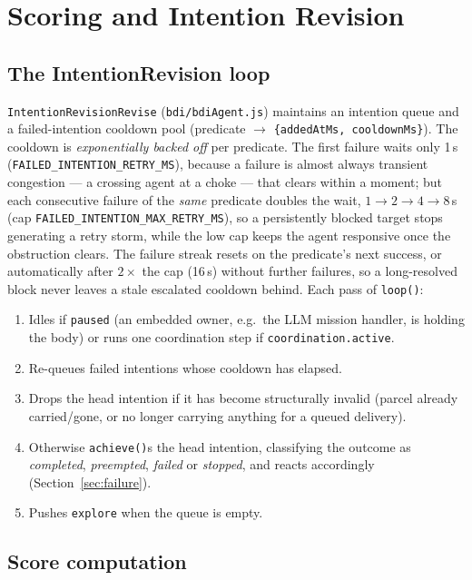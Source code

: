 \documentclass[11pt,a4paper]{article}
\begin{document}
\section{Scoring and Intention Revision}
\label{sec:scoring}

\subsection{The IntentionRevision loop}

\texttt{IntentionRevisionRevise} (\texttt{bdi/bdiAgent.js}) maintains an intention queue and a
failed-intention cooldown pool (predicate $\to$ \texttt{\{addedAtMs, cooldownMs\}}). The cooldown
is \emph{exponentially backed off} per predicate. The first failure waits only 1\,s
(\texttt{FAILED\_INTENTION\_RETRY\_MS}), because a failure is almost always transient congestion
--- a crossing agent at a choke --- that clears within a moment; but each consecutive failure of
the \emph{same} predicate doubles the wait, $1 \to 2 \to 4 \to 8$\,s
(cap \texttt{FAILED\_INTENTION\_MAX\_RETRY\_MS}), so a persistently blocked target stops
generating a retry storm, while the low cap keeps the agent responsive once the obstruction
clears. The failure streak resets on the predicate's next success, or automatically after
$2\times$ the cap (16\,s) without further failures, so a long-resolved block never leaves a stale
escalated cooldown behind. Each pass of \texttt{loop()}:

\begin{enumerate}
  \item Idles if \texttt{paused} (an embedded owner, e.g.\ the LLM mission handler, is holding
  the body) or runs one coordination step if \texttt{coordination.active}.
  \item Re-queues failed intentions whose cooldown has elapsed.
  \item Drops the head intention if it has become structurally invalid (parcel already
  carried/gone, or no longer carrying anything for a queued delivery).
  \item Otherwise \texttt{achieve()}s the head intention, classifying the outcome as
  \emph{completed}, \emph{preempted}, \emph{failed} or \emph{stopped}, and reacts accordingly
  (Section~\ref{sec:failure}).
  \item Pushes \texttt{explore} when the queue is empty.
\end{enumerate}

\subsection{Score computation}
\end{document}
